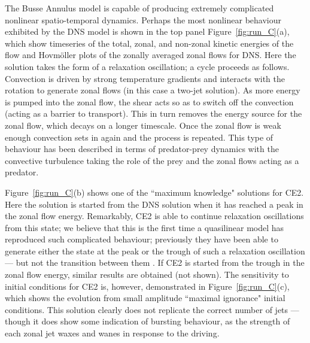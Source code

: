 \documentclass{jfm}
\begin{document}
The Busse Annulus model is capable of producing extremely complicated nonlinear spatio-temporal dynamics. Perhaps the most nonlinear behaviour exhibited by the DNS model is shown in the top panel Figure~\ref{fig:run_C}(a), which show timeseries of the total, zonal, and non-zonal kinetic energies of the flow and Hovm\"oller plots of the zonally averaged zonal flows for DNS. Here the solution takes the form of a relaxation oscillation; a cycle proceeds as follows. Convection is driven by strong temperature gradients and interacts with the rotation to generate zonal flows (in this case a two-jet solution). As more energy is pumped into the zonal flow, the shear acts so as to switch off the convection (acting as a barrier to transport). This in turn removes the energy source for the zonal flow, which decays on a longer timescale. Once the zonal flow is weak enough convection sets in again and the process is repeated. This type of behaviour has been described in terms of predator-prey dynamics with the convective turbulence taking the role of the prey and the zonal flows acting as a predator. 

Figure~\ref{fig:run_C}(b) shows one of the ``maximum knowledge" solutions for CE2. Here the solution is started from the DNS solution when it has reached a peak in the zonal flow energy. Remarkably, CE2 is able to continue relaxation oscillations from this state; we believe that this is the first time a quasilinear model has reproduced such complicated behaviour; previously they have been able to generate either the state at the peak or the trough of such a relaxation oscillation --- but not the transition between them \citep{pmt_2019}. If CE2 is started from the trough in the zonal flow energy, similar results are obtained (not shown). The sensitivity to initial conditions for CE2 is, however, demonstrated in Figure~\ref{fig:run_C}(c), which shows the evolution from small amplitude ``maximal ignorance" initial conditions. This solution clearly does not replicate the correct number of jets --- though it does show some indication of bursting behaviour, as the strength of each zonal jet waxes and wanes in response to the driving.







\end{document}
